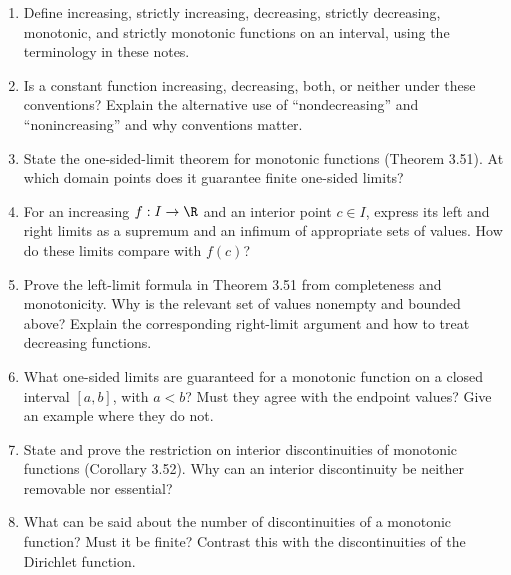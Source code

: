 \begin{enumerate}[resume]
  \item Define increasing, strictly increasing, decreasing, strictly
    decreasing, monotonic, and strictly monotonic functions on an interval,
    using the terminology in these notes.

  \item Is a constant function increasing, decreasing, both, or neither
    under these conventions? Explain the alternative use of
    ``nondecreasing'' and ``nonincreasing'' and why conventions matter.

  \item State the one-sided-limit theorem for monotonic functions
    (Theorem 3.51). At which domain points does it guarantee finite
    one-sided limits?

  \item For an increasing \(f:I\to\R\) and an interior point
    \(c\in I\), express its left and right limits as a supremum
    and an infimum of appropriate sets of values. How do these
    limits compare with \(f(c)\)?

  \item Prove the left-limit formula in Theorem 3.51 from completeness
    and monotonicity. Why is the relevant set of values nonempty
    and bounded above? Explain the corresponding right-limit argument
    and how to treat decreasing functions.

  \item What one-sided limits are guaranteed for a monotonic function
    on a closed interval \([a,b]\), with \(a<b\)? Must they agree
    with the endpoint values? Give an example where they do not.

  \item State and prove the restriction on interior discontinuities
    of monotonic functions (Corollary 3.52). Why can an interior
    discontinuity be neither removable nor essential?

  \item What can be said about the number of discontinuities of a
    monotonic function? Must it be finite? Contrast this with the
    discontinuities of the Dirichlet function.
\end{enumerate}
